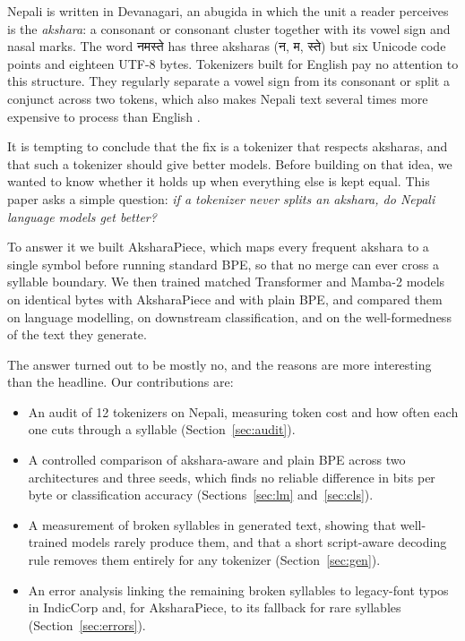\documentclass[11pt]{article}
\newcommand{\np}[1]{{\devfont #1}}                               %
\newcommand{\ap}{AksharaPiece}
\begin{document}
Nepali is written in Devanagari, an abugida in which the unit a reader perceives is the \emph{akshara}: a consonant or consonant cluster together with its vowel sign and nasal marks. The word \np{नमस्ते} has three aksharas (\np{न}, \np{म}, \np{स्ते}) but six Unicode code points and eighteen UTF-8 bytes. Tokenizers built for English pay no attention to this structure. They regularly separate a vowel sign from its consonant or split a conjunct across two tokens, which also makes Nepali text several times more expensive to process than English \citep{petrov2023tokenizers,ahia-etal-2023-languages}.

It is tempting to conclude that the fix is a tokenizer that respects aksharas, and that such a tokenizer should give better models. Before building on that idea, we wanted to know whether it holds up when everything else is kept equal. This paper asks a simple question: \emph{if a tokenizer never splits an akshara, do Nepali language models get better?}

To answer it we built \ap{}, which maps every frequent akshara to a single symbol before running standard BPE, so that no merge can ever cross a syllable boundary. We then trained matched Transformer and Mamba-2 models on identical bytes with \ap{} and with plain BPE, and compared them on language modelling, on downstream classification, and on the well-formedness of the text they generate.

The answer turned out to be mostly no, and the reasons are more interesting than the headline. Our contributions are:

\begin{itemize}
  \item An audit of 12 tokenizers on Nepali, measuring token cost and how often each one cuts through a syllable (Section~\ref{sec:audit}).
  \item A controlled comparison of akshara-aware and plain BPE across two architectures and three seeds, which finds no reliable difference in bits per byte or classification accuracy (Sections~\ref{sec:lm} and~\ref{sec:cls}).
  \item A measurement of broken syllables in generated text, showing that well-trained models rarely produce them, and that a short script-aware decoding rule removes them entirely for any tokenizer (Section~\ref{sec:gen}).
  \item An error analysis linking the remaining broken syllables to legacy-font typos in IndicCorp and, for \ap{}, to its fallback for rare syllables (Section~\ref{sec:errors}).
\end{itemize}
\end{document}
